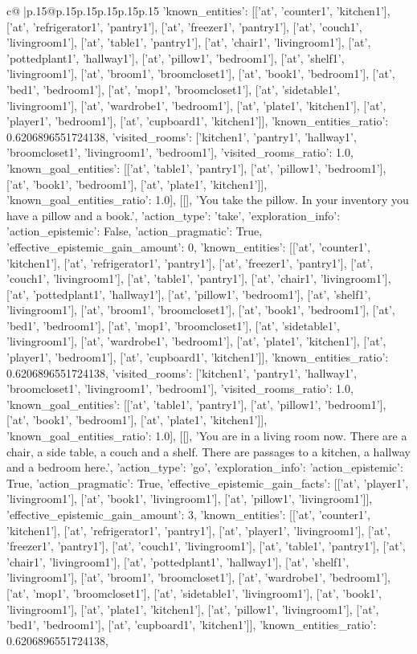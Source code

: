 \documentclass{article}
\begin{document}
{\begin{supertabular}{c@{$\;$}|p{.15\linewidth}@{}p{.15\linewidth}p{.15\linewidth}p{.15\linewidth}p{.15\linewidth}p{.15\linewidth}}
{{{'known_entities': [['at', 'counter1', 'kitchen1'], ['at', 'refrigerator1', 'pantry1'], ['at', 'freezer1', 'pantry1'], ['at', 'couch1', 'livingroom1'], ['at', 'table1', 'pantry1'], ['at', 'chair1', 'livingroom1'], ['at', 'pottedplant1', 'hallway1'], ['at', 'pillow1', 'bedroom1'], ['at', 'shelf1', 'livingroom1'], ['at', 'broom1', 'broomcloset1'], ['at', 'book1', 'bedroom1'], ['at', 'bed1', 'bedroom1'], ['at', 'mop1', 'broomcloset1'], ['at', 'sidetable1', 'livingroom1'], ['at', 'wardrobe1', 'bedroom1'], ['at', 'plate1', 'kitchen1'], ['at', 'player1', 'bedroom1'], ['at', 'cupboard1', 'kitchen1']], 'known_entities_ratio': 0.6206896551724138, 'visited_rooms': ['kitchen1', 'pantry1', 'hallway1', 'broomcloset1', 'livingroom1', 'bedroom1'], 'visited_rooms_ratio': 1.0, 'known_goal_entities': [['at', 'table1', 'pantry1'], ['at', 'pillow1', 'bedroom1'], ['at', 'book1', 'bedroom1'], ['at', 'plate1', 'kitchen1']], 'known_goal_entities_ratio': 1.0}}], [[], 'You take the pillow. In your inventory you have a pillow and a book.', {'action_type': 'take', 'exploration_info': {'action_epistemic': False, 'action_pragmatic': True, 'effective_epistemic_gain_amount': 0, 'known_entities': [['at', 'counter1', 'kitchen1'], ['at', 'refrigerator1', 'pantry1'], ['at', 'freezer1', 'pantry1'], ['at', 'couch1', 'livingroom1'], ['at', 'table1', 'pantry1'], ['at', 'chair1', 'livingroom1'], ['at', 'pottedplant1', 'hallway1'], ['at', 'pillow1', 'bedroom1'], ['at', 'shelf1', 'livingroom1'], ['at', 'broom1', 'broomcloset1'], ['at', 'book1', 'bedroom1'], ['at', 'bed1', 'bedroom1'], ['at', 'mop1', 'broomcloset1'], ['at', 'sidetable1', 'livingroom1'], ['at', 'wardrobe1', 'bedroom1'], ['at', 'plate1', 'kitchen1'], ['at', 'player1', 'bedroom1'], ['at', 'cupboard1', 'kitchen1']], 'known_entities_ratio': 0.6206896551724138, 'visited_rooms': ['kitchen1', 'pantry1', 'hallway1', 'broomcloset1', 'livingroom1', 'bedroom1'], 'visited_rooms_ratio': 1.0, 'known_goal_entities': [['at', 'table1', 'pantry1'], ['at', 'pillow1', 'bedroom1'], ['at', 'book1', 'bedroom1'], ['at', 'plate1', 'kitchen1']], 'known_goal_entities_ratio': 1.0}}], [[], 'You are in a living room now. There are a chair, a side table, a couch and a shelf. There are passages to a kitchen, a hallway and a bedroom here.', {'action_type': 'go', 'exploration_info': {'action_epistemic': True, 'action_pragmatic': True, 'effective_epistemic_gain_facts': [['at', 'player1', 'livingroom1'], ['at', 'book1', 'livingroom1'], ['at', 'pillow1', 'livingroom1']], 'effective_epistemic_gain_amount': 3, 'known_entities': [['at', 'counter1', 'kitchen1'], ['at', 'refrigerator1', 'pantry1'], ['at', 'player1', 'livingroom1'], ['at', 'freezer1', 'pantry1'], ['at', 'couch1', 'livingroom1'], ['at', 'table1', 'pantry1'], ['at', 'chair1', 'livingroom1'], ['at', 'pottedplant1', 'hallway1'], ['at', 'shelf1', 'livingroom1'], ['at', 'broom1', 'broomcloset1'], ['at', 'wardrobe1', 'bedroom1'], ['at', 'mop1', 'broomcloset1'], ['at', 'sidetable1', 'livingroom1'], ['at', 'book1', 'livingroom1'], ['at', 'plate1', 'kitchen1'], ['at', 'pillow1', 'livingroom1'], ['at', 'bed1', 'bedroom1'], ['at', 'cupboard1', 'kitchen1']], 'known_entities_ratio': 0.6206896551724138, }}}
\end{supertabular}}
\end{document}
